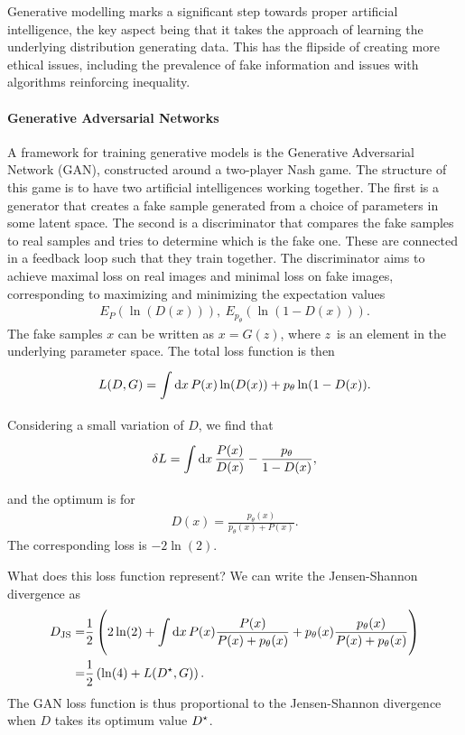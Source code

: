 Generative modelling marks a significant step towards proper artificial intelligence, the key aspect being that it takes the approach of learning the underlying distribution generating data. This has the flipside of creating more ethical issues, including the prevalence of fake information and issues with algorithms reinforcing inequality.

\paragraph{Generative Adversarial Networks}
A framework for training generative models is the Generative Adversarial Network (GAN), constructed around a two-player Nash game. The structure of this game is to have two artificial intelligences working together. The first is a generator that creates a fake sample generated from a choice of parameters in some latent space. The second is a discriminator that compares the fake samples to real samples and tries to determine which is the fake one. These are connected in a feedback loop such that they train together. The discriminator aims to achieve maximal loss on real images and minimal loss on fake images, corresponding to maximizing and minimizing the expectation values
\begin{align*}
	E_{P}(\ln(D(x))),\ E_{p_{\theta}}(\ln(1 - D(x))).
\end{align*}
The fake samples $x$ can be written as $x = G(z)$, where $z$ is an element in the underlying parameter space. The total loss function is then
\begin{align*}
	L(D, G) = \int\limits_{}^{}\dd{x}P(x)\ln(D(x)) + p_{\theta}\ln(1 - D(x)).
\end{align*}
Considering a small variation of $D$, we find that
\begin{align*}
	\var{L} = \int\limits_{}^{}\dd{x}\frac{P(x)}{D(x)} - \frac{p_{\theta}}{1 - D(x)},
\end{align*}
and the optimum is for
\begin{align*}
	D(x) = \frac{p_{\theta}(x)}{p_{\theta}(x) + P(x)}.
\end{align*}
The corresponding loss is $-2\ln(2)$.

What does this loss function represent? We can write the Jensen-Shannon divergence as
\begin{align*}
	D_{\text{JS}} =& \frac{1}{2}\left(2\ln(2) + \int\limits_{}^{}\dd{x}P(x)\frac{P(x)}{P(x) + p_{\theta}(x)} + p_{\theta}(x)\frac{p_{\theta}(x)}{P(x) + p_{\theta}(x)}\right) \\
	=& \frac{1}{2}\left(\ln(4) + L(D^{\star}, G)\right).
\end{align*}
The GAN loss function is thus proportional to the Jensen-Shannon divergence when $D$ takes its optimum value $D^{\star}$.

